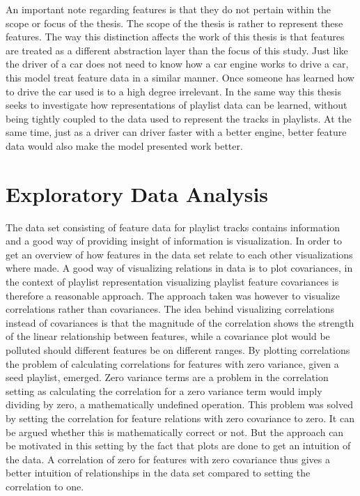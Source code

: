 \documentclass[a4paper,11pt]{kth-mag}
\begin{document}
An important note regarding features is that they do not pertain within the scope or focus of the thesis. The scope of the thesis is rather to represent these features. The way this distinction affects the work of this thesis is that features are treated as a different abstraction layer than the focus of this study. Just like the driver of a car does not need to know how a car engine works to drive a car, this model treat feature data in a similar manner. Once someone has learned how to drive the car used is to a high degree irrelevant. In the same way this thesis seeks to investigate how representations of playlist data can be learned, without being tightly coupled to the data used to represent the tracks in playlists. At the same time, just as a driver can driver faster with a better engine, better feature data would also make the model presented work better.

\section{Exploratory Data Analysis}
The data set consisting of feature data for playlist tracks contains information and a good way of providing insight of information is visualization. In order to get an overview of how features in the data set relate to each other visualizations where made. A good way of visualizing relations in data is to plot covariances, in the context of playlist representation visualizing playlist feature covariances is therefore a reasonable approach. The approach taken was however to visualize correlations rather than covariances. The idea behind visualizing correlations instead of covariances is that the magnitude of the correlation shows the strength of the linear relationship between features, while a covariance plot would be polluted should different features be on different ranges. By plotting correlations the problem of calculating correlations for features with zero variance, given a seed playlist, emerged. Zero variance terms are a problem in the correlation setting as calculating the correlation for a zero variance term would imply dividing by zero, a mathematically undefined operation. This problem was solved by setting the correlation for feature relations with zero covariance to zero. It can be argued whether this is mathematically correct or not. But the approach can be motivated in this setting by the fact that plots are done to get an intuition of the data. A correlation of zero for features with zero covariance thus gives a better intuition of relationships in the data set compared to setting the correlation to one.
\end{document}
